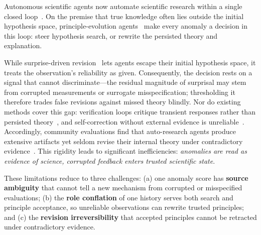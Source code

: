 \documentclass{article}
\begin{document}
Autonomous scientific agents now automate scientific research within a single closed loop~\citep{lu2024aiscientist,yamada2025aiscientistv2workshoplevelautomated,schmidgall2025agentlaboratory,gottweis2025aicoscientist}. 
On the premise that true knowledge often lies outside the initial hypothesis space, principle-evolution agents~\citep{pu2026pievo, pu2026piflowprincipleawarescientificdiscovery} make every anomaly a decision in this loop: steer hypothesis search, or rewrite the persisted theory and explanation.

While surprise-driven revision~\citep{pu2026pievo} lets agents escape their initial hypothesis space, it treats the observation's reliability as given. Consequently, the decision rests on a signal that cannot discriminate---the residual magnitude of surprisal may stem from corrupted measurements or surrogate misspecification; thresholding it therefore trades false revisions against missed theory blindly.
Nor do existing methods cover this gap: verification loops critique transient responses rather than persisted theory~\citep{shinn2023reflexion,madaan2023selfrefine,gou2023critic,dhuliawala2024chainverification}, and self-correction without external evidence is unreliable~\citep{huang2023cannotselfcorrect,kamoi2024selfcorrection}. 
Accordingly, community evaluations find that auto-research agents produce extensive artifacts yet seldom revise their internal theory under contradictory evidence~\citep{riosgarcia2026aiscientistsproduceresults,kirgis2026openendedresearch}. 
This rigidity leads to significant inefficiencies: \emph{anomalies are read as evidence of science, corrupted feedback enters trusted scientific state}.

These limitations reduce to three challenges: (a) one anomaly score has \textbf{source ambiguity} that cannot tell a new mechanism from corrupted or misspecified evaluations; (b) the \textbf{role conflation} of one history serves both search and principle acceptance, so unreliable observations can rewrite trusted principles; and (c) the \textbf{revision irreversibility} that accepted principles cannot be retracted under contradictory evidence.
\end{document}
